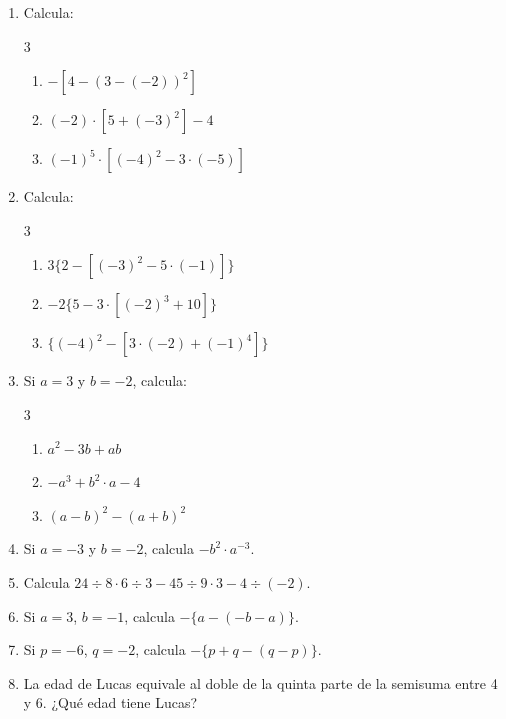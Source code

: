 \documentclass[11pt, letterpaper]{article}
\begin{document}
\begin{enumerate}[label=\textbf{\arabic*.}, leftmargin=*, resume]
  \item Calcula:
  \begin{multicols}{3}
  \begin{enumerate}[label=\alph*)]
    \item $-[4-(3-(-2))^2]$
    \item $(-2)\cdot[5+(-3)^2]-4$
    \item $(-1)^5\cdot[(-4)^2-3\cdot(-5)]$
  \end{enumerate}
  \end{multicols}

  \item Calcula:
  \begin{multicols}{3}
  \begin{enumerate}[label=\alph*)]
    \item $3\{2-[(-3)^2-5\cdot(-1)]\}$
    \item $-2\{5-3\cdot[(-2)^3+10]\}$
    \item $\{(-4)^2-[3\cdot(-2)+(-1)^4]\}$
  \end{enumerate}
  \end{multicols}

  \item Si $a=3$ y $b=-2$, calcula:
  \begin{multicols}{3}
  \begin{enumerate}[label=\alph*)]
    \item $a^2-3b+ab$
    \item $-a^3+b^2\cdot a-4$
    \item $(a-b)^2-(a+b)^2$
  \end{enumerate}
  \end{multicols}

  \item Si $a=-3$ y $b=-2$, calcula $-b^2\cdot a^{-3}$.

  \item Calcula $24\div 8\cdot 6\div 3-45\div 9\cdot 3-4\div(-2)$.

  \item Si $a=3$, $b=-1$, calcula $-\{a-(-b-a)\}$.

  \item Si $p=-6$, $q=-2$, calcula $-\{p+q-(q-p)\}$.

  \item La edad de Lucas equivale al doble de la quinta parte de la semisuma entre 4 y 6. ¿Qu\'e edad tiene Lucas?
\end{enumerate}
\end{document}
